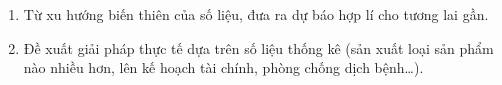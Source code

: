 \begin{enumerate}
\item Từ xu hướng biến thiên của số liệu, đưa ra dự báo hợp lí cho tương lai gần.
\item Đề xuất giải pháp thực tế dựa trên số liệu thống kê (sản xuất loại sản phẩm nào nhiều hơn, lên kế hoạch tài chính, phòng chống dịch bệnh\dots).
\end{enumerate}
